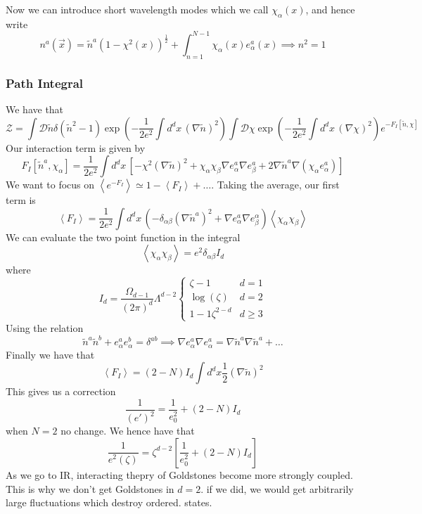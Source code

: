 Now we can introduce short wavelength modes 
which we call $ \chi_{ \alpha } ( x ) $, 
and hence write 
\[
	n ^ a ( \vec{x} )  = \tilde{ n } ^ a ( 1 - \chi ^ 2( x )  )^{ \frac{1}{2 } }  + 
	\int _{ n = 1 } ^{ N - 1 } \chi _{ \alpha } ( x) e ^ a _ \alpha ( x)  \implies n ^ 2 =1
\] 

\subsubsection{Path Integral} 
We have that 
\[
	\mathcal{ Z } = \int \mathcal{ D } \tilde{ n } \delta ( \tilde{ n } ^ 2-  1 ) \exp 
	\left(   - \frac{1}{2 e ^ 2 } \int d ^ d x \, ( \nabla \tilde{ n } ) ^ 2   \right) 
	\int \mathcal{ D } \chi \exp \left(  -\frac{1}{ 2 e ^ 2 } \int d ^ d x \, ( \nabla \chi ) ^ 2  \right)  
	e ^{  - F _ I [ \tilde{ n } , \chi ]  }
\] 
Our interaction term is given by 
\[
 F _ I \left[  \tilde{ n } ^ a , \chi _{ \alpha }   \right]  
  = \frac{1}{ 2 e  ^2 } \int d ^ d x \, \left[  
  - \chi ^ 2 ( \nabla \tilde{ n } ) ^ 2 + \chi _ \alpha \chi _ \beta 
  \nabla e ^ a _ \alpha \nabla e ^ a _ \beta + 2 \nabla \tilde{ n } ^ a \nabla ( \chi _ \alpha e ^ a _ \alpha )    \right]  
\]  We want to focus on $ \left< e ^{ - F _ I }  \right> \simeq 1 - \left< F _ I  \right> + \dots $. 
Taking the average, our first term is 
\[
 \left< F _ I  \right>  = \frac{1}{2 e ^ 2 } \int d ^ d  x \, 
 ( - \delta _{ \alpha \beta } ( \nabla \tilde{ n } ^ a ) ^ 2 + \nabla e ^ a _ \alpha \nabla e ^ \alpha _ \beta ) \left< \chi _ \alpha
 \chi _ \beta \right> 
\] We can evaluate the two point function in the integral 
\[
\left< \chi _ \alpha \chi _ \beta   \right>  = e^ 2 \delta _{ \alpha \beta } I _ d  
\] where 
\[
	I _ d = \frac{ \Omega_{ d - 1} }{ ( 2 \pi ) ^ d } \Lambda ^{ d - 2 } \begin{cases}
		\zeta - 1  & d = 1 \\ \log ( \zeta ) & d =  2\\ 1 - 1\zeta ^{2 - d  } & d \geq  3
	\end{cases} 
\] Using the relation 
\[
\tilde{ n } ^ a \tilde{ n } ^ b + e ^ a _ \alpha e ^ b _ \alpha  = \delta ^{ ab }    \implies 
\nabla e ^ a _ \alpha \nabla e ^ a _ \alpha = \nabla \tilde{ n } ^ a \nabla \tilde{ n } ^ a + \dots   
\] 
Finally we have that 
\[
	\left< F _ I  \right>  =( 2 - N ) I _ d \int d ^ d x  \frac{1}{2 } ( \nabla \tilde{ n } ) ^ 2  
\] This gives us a correction 
\[
	\frac{1}{( e ' ) ^ 2 } = \frac{1}{e _ 0 ^ 2 }+ ( 2 - N ) I _{ d }
\] when $ N = 2$ no change. 
We hence have that 
\[
	\frac{1}{e ^ 2 ( \zeta ) } = \zeta ^{ d - 2} \left[  \frac{1}{e _ 0 ^ 2 } + ( 2- N ) I _ d  \right] 
\] As we go to IR, interacting thepry of Goldstones become more strongly coupled. 
This is why we don't get Goldstones in $ d = 2$. if we did, we would get
arbitrarily large fluctuations which destroy ordered. states. 
